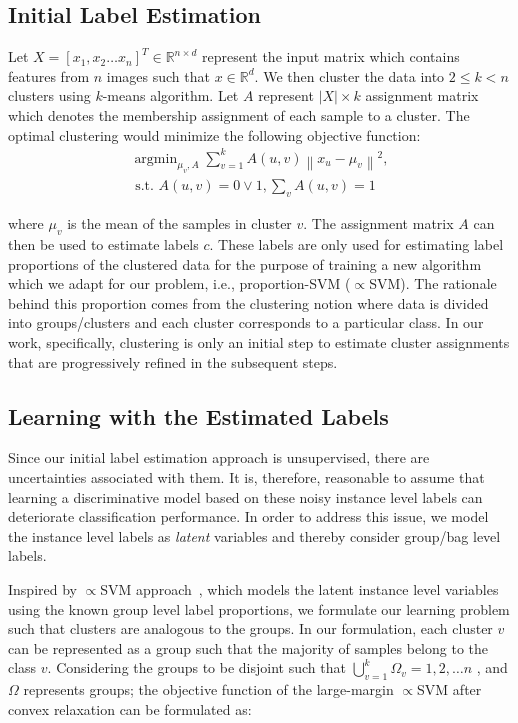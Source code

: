 \documentclass[journal]{IEEEtran}
\DeclareMathOperator*{\argminB}{argmin}
\begin{document}
\subsection{Initial Label Estimation}
Let $X=[x_1,x_2 \dots x_n]^T\in\mathbb{R}^{n \times d}$ represent the input matrix which contains features from $n$ images such that $x \in \mathbb{R}^d$. We then cluster the data into $2\leq k<n$ clusters using $k$-means algorithm. Let $A$ represent $|X| \times k$ assignment matrix which denotes the membership assignment of each sample to a cluster. The optimal clustering would minimize the following objective function:
\begin{equation}
\begin{split}
\argminB_{\mu_v,A} \sum_{v=1}^{k}A(u,v)\left \|x_u-\mu_v  \right \|^2,\\
\text{ s.t. }   A(u,v)=0 \vee 1,\sum_vA(u,v)=1 
\end{split}
\label{eq:kmeans}
\end{equation}


\noindent where $\mu_v$ is the mean of the samples in cluster $v$. The assignment matrix $A$ can then be used to estimate labels $c$. These labels are only used for estimating label proportions of the clustered data for the purpose of training a new algorithm which we adapt for our problem, i.e., proportion-SVM ($\propto$SVM). The rationale behind this proportion comes from the clustering notion where data is divided into groups/clusters and each cluster corresponds to a particular class. In our work, specifically, clustering is only an initial step to estimate cluster assignments that are progressively refined in the subsequent steps.%

\subsection{Learning with the Estimated Labels}

Since our initial label estimation approach is unsupervised, there are uncertainties associated with them. It is, therefore, reasonable to assume that learning a discriminative model based on these noisy instance level labels can deteriorate classification performance. In order to address this issue, we model the instance level labels as \textit{latent} variables and thereby consider group/bag level labels.

Inspired by $\propto$SVM approach~\cite{yu2013propto}, which models the latent instance level variables using the known group level label proportions, we formulate our learning problem such that clusters are analogous to the groups. In our formulation, each cluster $v$ can be represented as a group such that the majority of samples belong to the class $v$. Considering the groups to be disjoint such that $\bigcup_{v=1}^{k}$\textbf{$\Omega_v$}$={1,2,\dots n}$ , and $\Omega$ represents groups; the objective function of the large-margin $\propto$SVM after convex relaxation can be formulated as:
\end{document}
